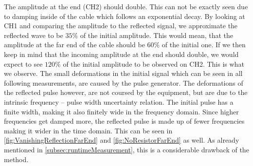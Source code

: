 \documentclass[a4paper,10pt,twocolumn]{article}
\begin{document}
    The amplitude at the end (CH2) should double.
    This can not be exactly seen due to damping inside of the cable which follows an exponential decay.
    By looking at CH1 and comparing the amplitude to the reflected signal, we approximate the reflected wave to be $35\%$ of the initial amplitude.
    This would mean, that the amplitude at the far end of the cable should be $60\%$ of the initial one.
    If we then keep in mind that the incoming amplitude at the end should double, we would expect to see $120\%$ of the initial amplitude to be observed on CH2.
    This is what we observe.
    The small deformations in the initial signal which can be seen in all following measurements, are caused by the pulse generator.
    The deformations of the reflected pulse however, are not coursed by the equipment, but are due to the intrinsic frequency -- pulse width uncertainty relation.
    The initial pulse has a finite width, making it also finitely wide in the frequency domain.
    Since higher frequencies get damped more, the reflected pulse is made up of fewer frequencies making it wider in the time domain.
    This can be seen in \autoref{fig:VanishingReflectionFarEnd} and \autoref{fig:NoResistorFarEnd} as well.
    As already mentioned in \autoref{subsec:runtimeMeasurement}, this is a considerable drawback of the method.
    
\end{document}

